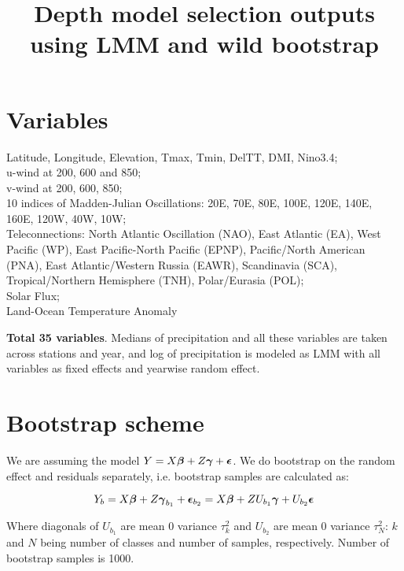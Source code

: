 \documentclass[fleqn,11pt]{article}
\begin{document}
\newtheorem{Theorem}{Theorem}[section]
\newtheorem{Lemma}[Theorem]{Lemma}
\newtheorem{Corollary}[Theorem]{Corollary}
\newtheorem{Proposition}[Theorem]{Proposition}
\theoremstyle{definition} \newtheorem{Definition}[Theorem]{Definition}

\title{Depth model selection outputs using LMM and wild bootstrap}
\maketitle

\section{Variables}
Latitude, Longitude, Elevation, Tmax, Tmin, DelTT, DMI, Nino3.4;\\
u-wind at 200, 600 and 850;\\
v-wind at 200, 600, 850;\\
10 indices of Madden-Julian Oscillations: 20E, 70E, 80E, 100E, 120E, 140E, 160E, 120W, 40W, 10W;\\
Teleconnections: North Atlantic Oscillation (NAO), East Atlantic (EA), West Pacific (WP), East Pacific-North Pacific (EPNP), Pacific/North American (PNA), East Atlantic/Western Russia (EAWR), Scandinavia (SCA), Tropical/Northern Hemisphere (TNH), Polar/Eurasia (POL);\\
Solar Flux;\\
Land-Ocean Temperature Anomaly

\textbf{Total 35 variables}. Medians of precipitation and all these variables are taken across stations and year, and log of precipitation is modeled as LMM with all variables as fixed effects and yearwise random effect.

\section{Bootstrap scheme}
We are assuming the model $Y = X{\boldsymbol{\beta}} + Z{\boldsymbol{\gamma}} + {\boldsymbol{\epsilon}}$. We do bootstrap on the random effect and residuals separately, i.e. bootstrap samples are calculated as:

$$ Y_b = X{\boldsymbol{\beta}} + Z{\boldsymbol{\gamma}}_{b_1} + {\boldsymbol{\epsilon}}_{b_2} = X{\boldsymbol{\beta}} + Z U_{b_1}{\boldsymbol{\gamma}} + U_{b_2}{\boldsymbol{\epsilon}} $$

Where diagonals of $U_{b_1}$ are mean 0 variance $\tau_k^2$ and $U_{b_2}$ are mean 0 variance $\tau_N^2$: $k$ and $N$ being number of classes and number of samples, respectively. Number of bootstrap samples is 1000.
\end{document}
